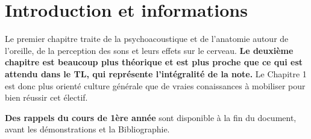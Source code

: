 \chapter*{Introduction et informations}
\noindent Le premier chapitre traite de la psychoacoustique et de l'anatomie autour de l'oreille, de la perception des sons et leurs effets sur le cerveau. 
\textbf{Le deuxième chapitre est beaucoup plus théorique et est plus proche que ce qui est attendu dans le TL, qui représente l'intégralité de la note. }
Le Chapitre 1 est donc plus orienté culture générale que de vraies conaissances à mobiliser pour bien réussir cet électif. \newline

\noindent \textbf{Des rappels du cours de 1ère année} sont disponible à la fin du document, avant les démonstrations et la Bibliographie.
